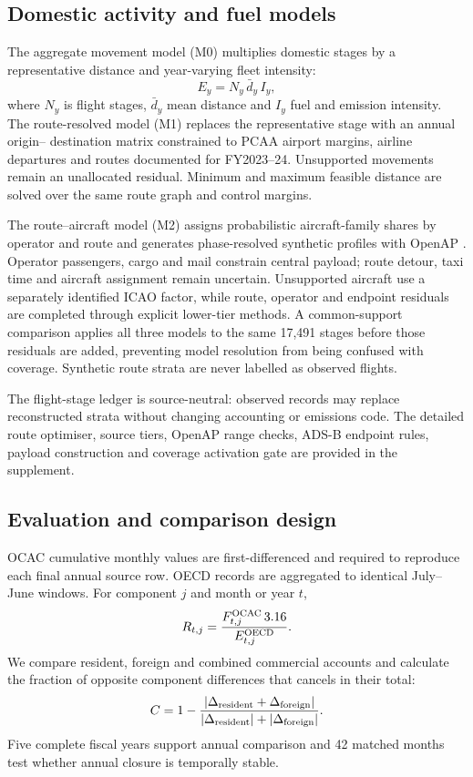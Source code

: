 \subsection{Domestic activity and fuel models}

The aggregate movement model (M0) multiplies domestic stages by a representative distance and
year-varying fleet intensity:
\begin{equation}
E_y=N_y\,\bar d_y\,I_y,
\end{equation}
where $N_y$ is flight stages, $\bar d_y$ mean distance and $I_y$ fuel and emission intensity.
The route-resolved model (M1) replaces the representative stage with an annual origin--
destination matrix constrained to PCAA airport margins, airline departures and routes
documented for FY2023--24. Unsupported movements remain an unallocated residual. Minimum and
maximum feasible distance are solved over the same route graph and control margins.

The route--aircraft model (M2) assigns probabilistic aircraft-family shares by operator and
route and generates phase-resolved synthetic profiles with OpenAP \citep{sun2020openap}.
Operator passengers, cargo and mail constrain central payload; route detour, taxi time and
aircraft assignment remain uncertain. Unsupported aircraft use a separately identified ICAO
factor, while route, operator and endpoint residuals are completed through explicit lower-tier
methods. A common-support comparison applies all three models to the same 17,491 stages before
those residuals are added, preventing model resolution from being confused with coverage.
Synthetic route strata are never labelled as observed flights.

The flight-stage ledger is source-neutral: observed records may replace reconstructed strata
without changing accounting or emissions code. The detailed route optimiser, source tiers,
OpenAP range checks, ADS-B endpoint rules, payload construction and coverage activation gate
are provided in the supplement.

\subsection{Evaluation and comparison design}

OCAC cumulative monthly values are first-differenced and required to reproduce each final
annual source row. OECD records are aggregated to identical July--June windows. For component
$j$ and month or year $t$,
\begin{equation}
R_{t,j}=\frac{F^{\rm OCAC}_{t,j}\,3.16}{E^{\rm OECD}_{t,j}}.
\end{equation}
We compare resident, foreign and combined commercial accounts and calculate the fraction of
opposite component differences that cancels in their total:
\begin{equation}
C=1-\frac{|\Delta_{\rm resident}+\Delta_{\rm foreign}|}
{|\Delta_{\rm resident}|+|\Delta_{\rm foreign}|}.
\end{equation}
Five complete fiscal years support annual comparison and 42 matched months test whether annual
closure is temporally stable.


